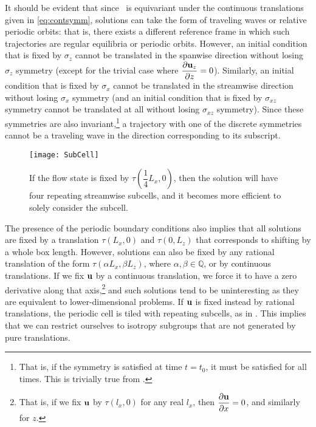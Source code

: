 It should be evident that since \pCf\ is equivariant under the continuous translations given in \eqref{eq:contsymm}, solutions can take the form of traveling waves or relative periodic orbits: that is, there exists a different reference frame in which such trajectories are regular equilibria or periodic orbits. However, an initial condition that is fixed by $\sigma_z$ cannot be translated in the spanwise direction without losing $\sigma_z$ symmetry (except for the trivial case where $\pder{1}{\Vector{u}_z}{z} = 0$). Similarly, an initial condition that is fixed by $\sigma_x$ cannot be translated in the streamwise direction without losing $\sigma_x$ symmetry (and an initial condition that is fixed by $\sigma_{xz}$ symmetry cannot be translated at all without losing $\sigma_{xz}$ symmetry). Since these symmetries are also invariant,\footnote{That is, if the symmetry is satisfied at time $t = t_0$, it must be satisfied for all times. This is trivially true from .} a trajectory with one of the discrete symmetries cannot be a traveling wave in the direction corresponding to its subscript. \\
 \begin{figure}[t!]
\texttt{[image: SubCell]}
\caption{If the flow state is fixed by $\tau(\dfrac{1}{4}L_x,0)$, then the solution will have four repeating streamwise subcells, and it becomes more efficient to solely consider the subcell.}\label{fig:rationalTranslation}

\end{figure}
The presence of the periodic boundary conditions also implies that all solutions are fixed by a translation $\tau(L_x,0)$ and $\tau(0,L_z)$ that corresponds to shifting by a whole box length. However, solutions can also be fixed by any rational translation of the form $\tau(\alpha L_x,\beta L_z)$, where $\alpha,\beta \in \mathbb{Q}$, or by  continuous translations. If we fix $\mathbf{u}$ by a continuous translation, we force it to have a zero derivative along that axis,\footnote{That is, if we fix $\mathbf{u}$ by $\tau(l_x,0)$ for any real $l_x$, then $\pder{1}{\Vector{u}}{x} = 0$, and similarly for $z$.} and such solutions tend to be uninteresting as they are equivalent to lower-dimensional problems. If $\mathbf{u}$ is fixed instead by rational translations, the periodic cell is tiled with repeating subcells, as in . This implies that we can restrict ourselves to isotropy subgroups that are not generated by pure translations.\\

